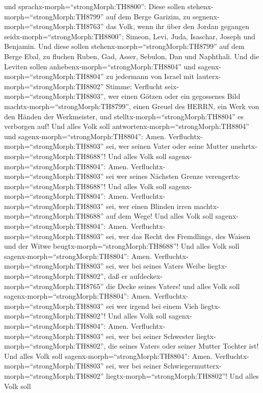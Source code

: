 und sprachx-morph=``strongMorph:TH8800'':  Diese sollen
stehenx-morph=``strongMorph:TH8799'' auf dem Berge Garizim, zu
segnenx-morph=``strongMorph:TH8763'' das Volk, wenn ihr über den Jordan
gegangen seidx-morph=``strongMorph:TH8800''; Simeon, Levi, Juda,
Isaschar, Joseph und Benjamin.  Und diese sollen
stehenx-morph=``strongMorph:TH8799'' auf dem Berge Ebal, zu fluchen
Ruben, Gad, Asser, Sebulon, Dan und Naphthali.  Und die
Leviten sollen anhebenx-morph=``strongMorph:TH8804'' und
sagenx-morph=``strongMorph:TH8804'' zu jedermann von Israel mit
lauterx-morph=``strongMorph:TH8802'' Stimme:  Verflucht
seix-morph=``strongMorph:TH8803'', wer einen Götzen oder ein gegossenes
Bild machtx-morph=``strongMorph:TH8799'', einen Greuel des HERRN, ein
Werk von den Händen der Werkmeister, und
stelltx-morph=``strongMorph:TH8804'' es verborgen auf! Und alles Volk
soll antwortenx-morph=``strongMorph:TH8804'' und
sagenx-morph=``strongMorph:TH8804'': Amen. 
Verfluchtx-morph=``strongMorph:TH8803'' sei, wer seinen Vater oder seine
Mutter unehrtx-morph=``strongMorph:TH8688''! Und alles Volk soll
sagenx-morph=``strongMorph:TH8804'': Amen. 
Verfluchtx-morph=``strongMorph:TH8803'' sei wer seines Nächsten Grenze
verengertx-morph=``strongMorph:TH8688''! Und alles Volk soll
sagenx-morph=``strongMorph:TH8804'': Amen. 
Verfluchtx-morph=``strongMorph:TH8803'' sei, wer einen Blinden irren
machtx-morph=``strongMorph:TH8688'' auf dem Wege! Und alles Volk soll
sagenx-morph=``strongMorph:TH8804'': Amen. 
Verfluchtx-morph=``strongMorph:TH8803'' sei, wer das Recht des
Fremdlings, des Waisen und der Witwe
beugtx-morph=``strongMorph:TH8688''! Und alles Volk soll
sagenx-morph=``strongMorph:TH8804'': Amen. 
Verfluchtx-morph=``strongMorph:TH8803'' sei, wer bei seines Vaters Weibe
liegtx-morph=``strongMorph:TH8802'', daß er
aufdeckex-morph=``strongMorph:TH8765'' die Decke seines Vaters! und
alles Volk soll sagenx-morph=``strongMorph:TH8804'': Amen. 
Verfluchtx-morph=``strongMorph:TH8803'' sei wer irgend bei einem Vieh
liegtx-morph=``strongMorph:TH8802''! Und alles Volk soll
sagenx-morph=``strongMorph:TH8804'': Amen. 
Verfluchtx-morph=``strongMorph:TH8803'' sei, wer bei seiner Schwester
liegtx-morph=``strongMorph:TH8802'', die seines Vaters oder seiner
Mutter Tochter ist! Und alles Volk soll
sagenx-morph=``strongMorph:TH8804'': Amen. 
Verfluchtx-morph=``strongMorph:TH8803'' sei, wer bei seiner
Schwiegermutterx-morph=``strongMorph:TH8802''
liegtx-morph=``strongMorph:TH8802''! Und alles Volk soll
